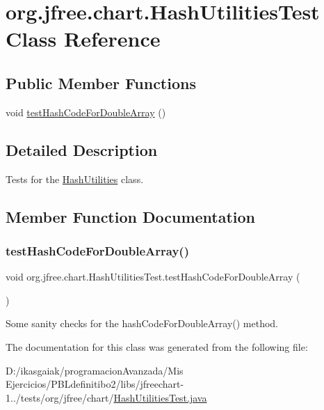 \hypertarget{classorg_1_1jfree_1_1chart_1_1_hash_utilities_test}{}\section{org.\+jfree.\+chart.\+Hash\+Utilities\+Test Class Reference}
\label{classorg_1_1jfree_1_1chart_1_1_hash_utilities_test}
\subsection*{Public Member Functions}
\begin{DoxyCompactItemize}
\item 
void \mbox{\hyperlink{classorg_1_1jfree_1_1chart_1_1_hash_utilities_test_a53b0bd471c1a35cc031ac2a496113c28}{test\+Hash\+Code\+For\+Double\+Array}} ()
\end{DoxyCompactItemize}


\subsection{Detailed Description}
Tests for the \mbox{\hyperlink{classorg_1_1jfree_1_1chart_1_1_hash_utilities}{Hash\+Utilities}} class. 

\subsection{Member Function Documentation}
\mbox{\label{classorg_1_1jfree_1_1chart_1_1_hash_utilities_test_a53b0bd471c1a35cc031ac2a496113c28}} 
\subsubsection{\texorpdfstring{test\+Hash\+Code\+For\+Double\+Array()}{testHashCodeForDoubleArray()}}
{\footnotesize\ttfamily void org.\+jfree.\+chart.\+Hash\+Utilities\+Test.\+test\+Hash\+Code\+For\+Double\+Array (\begin{DoxyParamCaption}{ }\end{DoxyParamCaption})}

Some sanity checks for the hash\+Code\+For\+Double\+Array() method. 

The documentation for this class was generated from the following file\+:\begin{DoxyCompactItemize}
\item 
D\+:/ikasgaiak/programacion\+Avanzada/\+Mis Ejercicios/\+P\+B\+Ldefinitibo2/libs/jfreechart-\/1../tests/org/jfree/chart/\mbox{\hyperlink{_hash_utilities_test_8java}{Hash\+Utilities\+Test.\+java}}\end{DoxyCompactItemize}
